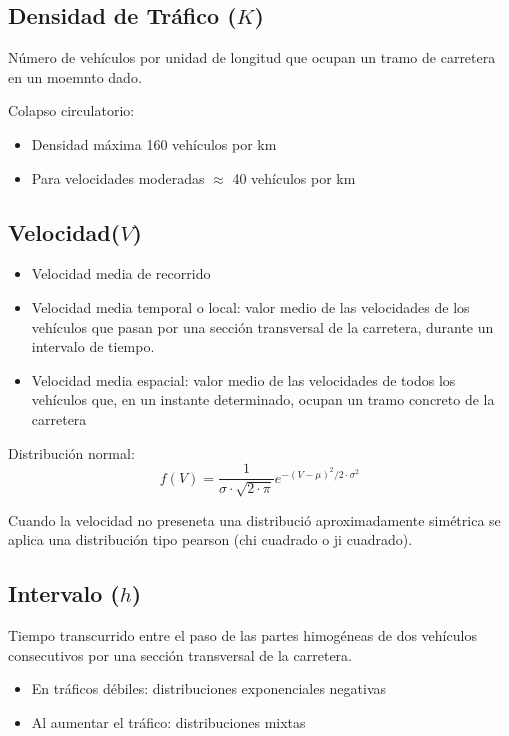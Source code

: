 \subsection{Densidad de Tráfico ($K$)}
Número de vehículos por unidad de longitud que ocupan un tramo de carretera en un moemnto dado.

Colapso circulatorio:
\begin{itemize}
    \item Densidad máxima 160 vehículos por km
    \item Para velocidades moderadas $\approx$ 40 vehículos por km
\end{itemize}

\subsection{Velocidad($V$)}
\begin{itemize}
    \item Velocidad media de recorrido
    \item Velocidad media temporal o local: valor medio de las velocidades de los vehículos que pasan por una sección transversal de la carretera, durante un intervalo de tiempo.
    \item Velocidad media espacial: valor medio de las velocidades de todos los vehículos que, en un instante determinado, ocupan un tramo concreto de la carretera
\end{itemize}

Distribución normal:
\begin{equation}
    f(V) = \frac{1}{\sigma \cdot \sqrt{2 \cdot \pi}} e^{- (V - \mu)^2/2\cdot \sigma^2}
\end{equation}

Cuando la velocidad no preseneta una distribució aproximadamente simétrica se aplica una distribución tipo pearson (chi cuadrado o ji cuadrado).

\subsection{Intervalo ($h$)}
Tiempo transcurrido entre el paso de las partes himogéneas de dos vehículos consecutivos por una sección transversal de la carretera.
\begin{itemize}
    \item En tráficos débiles: distribuciones exponenciales negativas
    \item Al aumentar el tráfico: distribuciones mixtas
\end{itemize}

